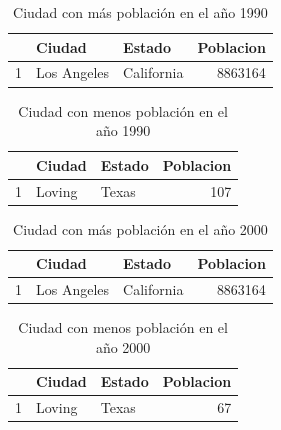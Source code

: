 \begin{table}[ht]
\centering
\begin{tabular}{rllr}
  \hline
 & Ciudad & Estado & Poblacion \\ 
  \hline
1 & Los Angeles & California & 8863164 \\ 
   \hline
\end{tabular}
\caption{Ciudad con más población en el año 1990} 
\end{table}


\begin{table}[ht]
\centering
\begin{tabular}{rllr}
  \hline
 & Ciudad & Estado & Poblacion \\ 
  \hline
1 & Loving & Texas & 107 \\ 
   \hline
\end{tabular}
\caption{Ciudad con menos población en el año 1990} 
\end{table}


\begin{table}[ht]
\centering
\begin{tabular}{rllr}
  \hline
 & Ciudad & Estado & Poblacion \\ 
  \hline
1 & Los Angeles & California & 8863164 \\ 
   \hline
\end{tabular}
\caption{Ciudad con más población en el año 2000} 
\end{table}


\begin{table}[ht]
\centering
\begin{tabular}{rllr}
  \hline
 & Ciudad & Estado & Poblacion \\ 
  \hline
1 & Loving & Texas &  67 \\ 
   \hline
\end{tabular}
\caption{Ciudad con menos población en el año 2000} 
\end{table}


